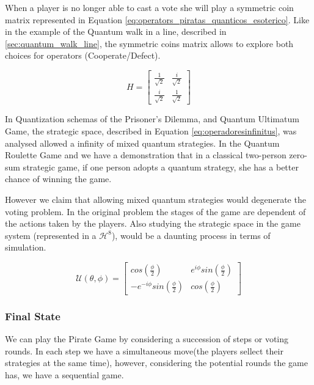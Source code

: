 When a player is no longer able to cast a vote she will play a symmetric coin matrix represented in Equation \ref{eq:operators_piratas_quanticos_esoterico}. Like in the example of the Quantum walk in a line, described in \ref{sec:quantum_walk_line}, the symmetric coins matrix allows to explore both choices for operators (Cooperate/Defect).

\begin{equation}
H = \left[\begin{array}{cc}
\frac{1}{\sqrt{2}} & \frac{i}{\sqrt{2}}\\
\frac{i}{\sqrt{2}} & \frac{1}{\sqrt{2}}
\end{array}\right]
\label{eq:operators_piratas_quanticos_esoterico}
\end{equation}

In Quantization schemas of the Prisoner's Dilemma\cite{Letters2002}\cite{Eisert2008}, and Quantum Ultimatum Game\cite{Fra2011}, the strategic space, described in Equation \ref{eq:operadoresinfinitus}, was analysed allowed a infinity of mixed quantum strategies. In the Quantum Roulette Game\cite{Salimi2009} and \cite{Meyer1999} we have a demonstration that in a classical two-person zero-sum strategic game, if one person adopts a quantum strategy, she has a better chance of winning the game. 

However we claim that allowing mixed quantum strategies would degenerate the voting problem. In the original problem the stages of the game are dependent of the actions taken by the players. Also studying the strategic space in the game system (represented in a $\mathcal{H}^{8}$), would be a daunting process in terms of simulation. 

\begin{equation}
\mathcal{U}(\theta,\phi) = \left[\begin{array}{cc}
cos(\frac{\phi}{2}) & e^{i\phi}sin(\frac{\phi}{2})\\
-e^{-i\phi}sin(\frac{\phi}{2}) & cos(\frac{\phi}{2})
\end{array}\right]
\label{eq:operadoresinfinitus}
\end{equation}

\subsubsection{Final State}
\label{subsec:pirates_finalstate}

We can play the Pirate Game by considering a succession of steps or voting rounds. In each step we have a simultaneous move(the players sellect their strategies at the same time), however, considering the potential rounds the game has, we have a sequential game. 


